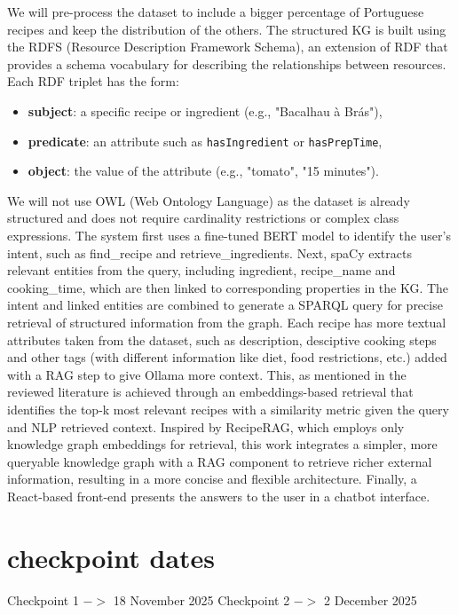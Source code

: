 \documentclass[a4paper,10pt]{article}
\begin{document}
We will pre-process the dataset to include a bigger percentage of Portuguese recipes and keep the distribution of the others. The structured KG is built using the RDFS (Resource Description Framework Schema), an extension of RDF that provides a schema vocabulary for describing the relationships between resources. Each RDF triplet has the form:
\begin{itemize}
    \item \textbf{subject}: a specific recipe or ingredient (e.g., "Bacalhau à Brás"),
    \item \textbf{predicate}: an attribute such as \texttt{hasIngredient} or \texttt{hasPrepTime},
    \item \textbf{object}: the value of the attribute (e.g., "tomato", "15 minutes").
\end{itemize}
\noindent
We will not use OWL (Web Ontology Language) as the dataset is already structured and does not require cardinality restrictions or complex class expressions.  
The system first uses a fine-tuned BERT model to identify the user’s intent, such as find\_recipe and retrieve\_ingredients. Next, spaCy extracts relevant entities from the query, including ingredient, recipe\_name and cooking\_time, which are then linked to corresponding properties in the KG. The intent and linked entities are combined to generate a SPARQL query for precise retrieval of structured information from the graph. Each recipe has more textual attributes taken from the dataset, such as description, desciptive cooking steps and other tags (with different information like diet, food restrictions, etc.) added with a RAG step to give Ollama more context. This, as mentioned in the reviewed literature is achieved through an embeddings-based retrieval that identifies the top-k most relevant recipes with a similarity metric given the query and NLP retrieved context. Inspired by RecipeRAG, which employs only knowledge graph embeddings for retrieval, this work integrates a simpler, more queryable knowledge graph with a RAG component to retrieve richer external information, resulting in a more concise and flexible architecture. Finally, a React-based front-end presents the answers to the user in a chatbot interface.

\section{checkpoint dates}

Checkpoint 1 $->$ 18 November 2025
Checkpoint 2 $->$ 2 December 2025
\end{document}

